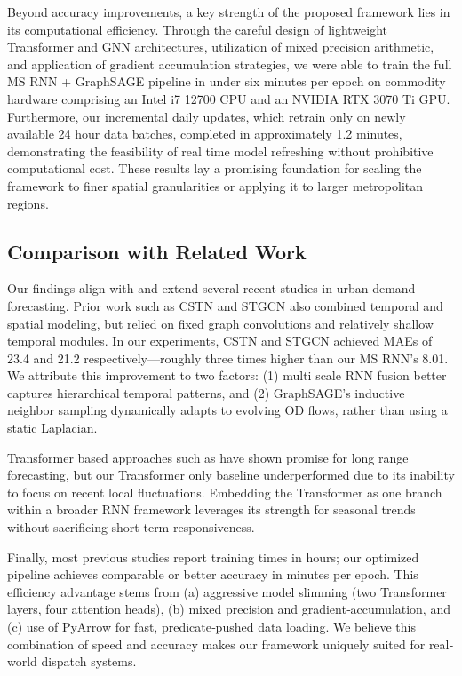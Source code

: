 \documentclass{article}
\begin{document}
Beyond accuracy improvements, a key strength of the proposed framework lies in its computational efficiency. Through the careful design of lightweight Transformer and GNN architectures, utilization of mixed precision arithmetic, and application of gradient accumulation strategies, we were able to train the full MS RNN + GraphSAGE pipeline in under six minutes per epoch on commodity hardware comprising an Intel i7 12700 CPU and an NVIDIA RTX 3070 Ti GPU. Furthermore, our incremental daily updates, which retrain only on newly available 24 hour data batches, completed in approximately 1.2 minutes, demonstrating the feasibility of real time model refreshing without prohibitive computational cost. These results lay a promising foundation for scaling the framework to finer spatial granularities or applying it to larger metropolitan regions.

\subsection{Comparison with Related Work}

Our findings align with and extend several recent studies in urban demand forecasting.  Prior work such as CSTN \cite{liu_2019_contextualized} and STGCN \cite{yu_2018_spatiotemporal} also combined temporal and spatial modeling, but relied on fixed graph convolutions and relatively shallow temporal modules.  In our experiments, CSTN and STGCN achieved MAEs of 23.4 and 21.2 respectively—roughly three times higher than our MS RNN’s 8.01.  We attribute this improvement to two factors: (1) multi scale RNN fusion better captures hierarchical temporal patterns, and (2) GraphSAGE’s inductive neighbor sampling dynamically adapts to evolving OD flows, rather than using a static Laplacian.  

Transformer based approaches such as \cite{li_2023_a} have shown promise for long range forecasting, but our Transformer only baseline underperformed due to its inability to focus on recent local fluctuations.  Embedding the Transformer as one branch within a broader RNN framework leverages its strength for seasonal trends without sacrificing short term responsiveness.  

Finally, most previous studies report training times in hours; our optimized pipeline achieves comparable or better accuracy in minutes per epoch.  This efficiency advantage stems from (a) aggressive model slimming (two Transformer layers, four attention heads), (b) mixed precision and gradient‐accumulation, and (c) use of PyArrow for fast, predicate‐pushed data loading.  We believe this combination of speed and accuracy makes our framework uniquely suited for real‐world dispatch systems.
\end{document}
